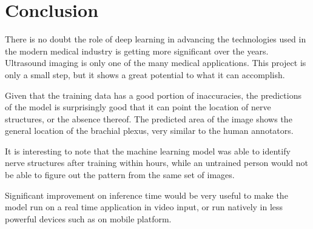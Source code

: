 \section{Conclusion}

There is no doubt the role of deep learning in advancing the technologies used in the modern medical industry is getting more significant over the years. Ultrasound imaging is only one of the many medical applications. This project is only a small step, but it shows a great potential to what it can accomplish.

Given that the training data has a good portion of inaccuracies, the predictions of the model is surprisingly good that it can point the location of nerve structures, or the absence thereof. The predicted area of the image shows the general location of the brachial plexus, very similar to the human annotators.

It is interesting to note that the machine learning model was able to identify nerve structures after training within hours, while an untrained person would not be able to figure out the pattern from the same set of images.

Significant improvement on inference time would be very useful to make the model run on a real time application in video input, or run natively in less powerful devices such as on mobile platform.
